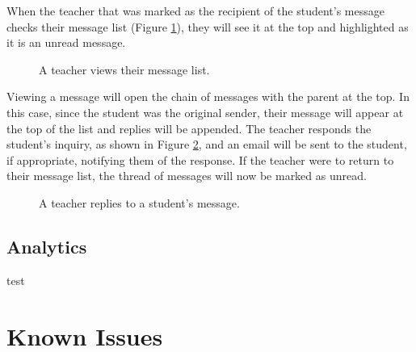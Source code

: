 When the teacher that was marked as the recipient of the student's message checks their message list (Figure \ref{fig:screens-message-list}), they will see it at the top and highlighted as it is an unread message.

\begin{figure}[h!]
	\centering
	\caption{A teacher views their message list.}
	\label{fig:screens-message-list}
\end{figure}

Viewing a message will open the chain of messages with the parent at the top. In this case, since the student was the original sender, their message will appear at the top of the list and replies will be appended. The teacher responds the student's inquiry, as shown in Figure \ref{fig:screens-message-reply}, and an email will be sent to the student, if appropriate, notifying them of the response. If the teacher were to return to their message list, the thread of messages will now be marked as unread.

\begin{figure}[h!]
	\centering
	\caption{A teacher replies to a student's message.}
	\label{fig:screens-message-reply}
\end{figure}

\subsection{Analytics}
\label{subsec:design-analytics}
test

\section{Known Issues}